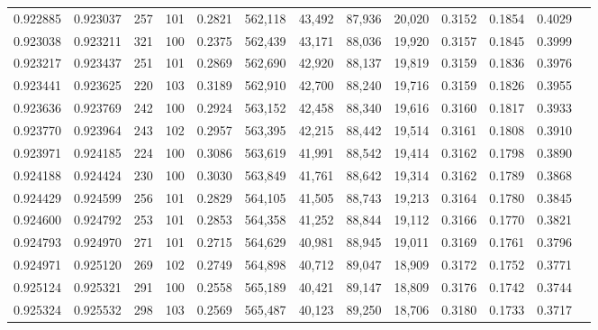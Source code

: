 \begin{tabular}{rrrrrrrrrrrrr}
0.922885 & 0.923037 &   257 & 101 &                                     0.2821 & 562,118 &  43,492 &  87,936 &  20,020 & 0.3152 & 0.1854 & 0.4029 \\
0.923038 & 0.923211 &   321 & 100 &                                     0.2375 & 562,439 &  43,171 &  88,036 &  19,920 & 0.3157 & 0.1845 & 0.3999 \\
0.923217 & 0.923437 &   251 & 101 &                                     0.2869 & 562,690 &  42,920 &  88,137 &  19,819 & 0.3159 & 0.1836 & 0.3976 \\
0.923441 & 0.923625 &   220 & 103 &                                     0.3189 & 562,910 &  42,700 &  88,240 &  19,716 & 0.3159 & 0.1826 & 0.3955 \\
0.923636 & 0.923769 &   242 & 100 &                                     0.2924 & 563,152 &  42,458 &  88,340 &  19,616 & 0.3160 & 0.1817 & 0.3933 \\
0.923770 & 0.923964 &   243 & 102 &                                     0.2957 & 563,395 &  42,215 &  88,442 &  19,514 & 0.3161 & 0.1808 & 0.3910 \\
0.923971 & 0.924185 &   224 & 100 &                                     0.3086 & 563,619 &  41,991 &  88,542 &  19,414 & 0.3162 & 0.1798 & 0.3890 \\
0.924188 & 0.924424 &   230 & 100 &                                     0.3030 & 563,849 &  41,761 &  88,642 &  19,314 & 0.3162 & 0.1789 & 0.3868 \\
0.924429 & 0.924599 &   256 & 101 &                                     0.2829 & 564,105 &  41,505 &  88,743 &  19,213 & 0.3164 & 0.1780 & 0.3845 \\
0.924600 & 0.924792 &   253 & 101 &                                     0.2853 & 564,358 &  41,252 &  88,844 &  19,112 & 0.3166 & 0.1770 & 0.3821 \\
0.924793 & 0.924970 &   271 & 101 &                                     0.2715 & 564,629 &  40,981 &  88,945 &  19,011 & 0.3169 & 0.1761 & 0.3796 \\
0.924971 & 0.925120 &   269 & 102 &                                     0.2749 & 564,898 &  40,712 &  89,047 &  18,909 & 0.3172 & 0.1752 & 0.3771 \\
0.925124 & 0.925321 &   291 & 100 &                                     0.2558 & 565,189 &  40,421 &  89,147 &  18,809 & 0.3176 & 0.1742 & 0.3744 \\
0.925324 & 0.925532 &   298 & 103 &                                     0.2569 & 565,487 &  40,123 &  89,250 &  18,706 & 0.3180 & 0.1733 & 0.3717 \\

\end{tabular}
